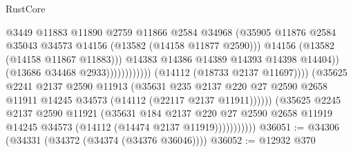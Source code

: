 \begin{lexlean}{RustCore}
\begin{coremodule}
                                                      @3449
                                                      @11883
                                                      @11890
                                                      @2759
                                                      @11866
                                                      @2584
                                                      @34968
                                                      (@35905
                                                        @11876
                                                        @2584
                                                        @35043
                                                        @34573
                                                        @14156
                                                        (@13582 (@14158 @11877 @2590)))
                                                      @14156
                                                      (@13582 (@14158 @11867 @11883)))
                                                    @14383
                                                    @14386
                                                    @14389
                                                    @14393
                                                    @14398
                                                    @14404))
                                                (@13686 @34468 @2933))))))))))))
                          (@14112 (@18733 @2137 @11697))))
                      (@35625
                        @2241
                        @2137
                        @2590
                        @11913
                        (@35631
                          @235
                          @2137
                          @220
                          @27
                          @2590
                          @2658
                          @11911
                          @14245
                          @34573
                          (@14112 (@22117 @2137 @11911))))))
                  (@35625
                    @2245
                    @2137
                    @2590
                    @11921
                    (@35631
                      @184
                      @2137
                      @220
                      @27
                      @2590
                      @2658
                      @11919
                      @14245
                      @34573
                      (@14112 (@14474 @2137 @11919)))))))))))
@36051 := @34306 (@34331 (@34372 (@34374 (@34376 @36046))))
@36052 := @12932 @370

\end{coremodule}
\end{lexlean}
